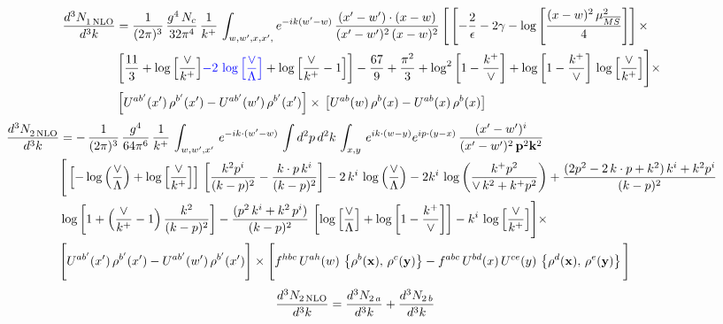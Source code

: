 \documentclass[9pt]{article}
\numberwithin{equation}{section}
\begin{document}
\begin{align}
     \frac{d^{3}N_{1\,\rm NLO}^{\rm}}{d^{3}k} &  = \frac{1}{(2\pi)^{3}}\, \frac{g^{4}\,N_{c}}{32\pi^{4}}\,\frac{1}{k^{+}}\, \int_{w, w',x,x',} e^{-ik(w^\prime-w)}\, \frac{(x'-w')\cdot (x-w)}{(x'-w')^{2}\, (x-w)^{2}}\, \Bigg[\left[-\frac{2}{\epsilon}-2\gamma-\log{\left[\frac{(x-w)^{2}\,\mu^{2}_{\overline{MS}}}{4}\right]}\right]\times \notag \\ & \left[\frac{11}{3}+\log{\left[\frac{\vee}{k^{+}}\right]}{\color{blue}-2\,\log{\left[\frac{\vee}{\Lambda}\right]}}+\log{\left[\frac{\vee}{k^{+}}-1\right]}\right]-\frac{67}{9}+\frac{\pi^{2}}{3}+\log^{2}{\left[1-\frac{k^{+}}{\vee}\right]}+\log{\left[1-\frac{k^{+}}{\vee}\right]}\,\log{\left[\frac{\vee}{k^{+}}\right]}\Bigg]\times\notag \\ & \left[U^{ab'}(x')\,\rho^{b'}(x') - U^{ab'}(w')\,\rho^{b'}(x')\right]\times\,\left[U^{ab}(w)\,\rho^{b}(x) - U^{ab}(x)\,\rho^{b}(x)\right]
\end{align}
\begin{align}
   \frac{d^{3}N_{2\,\rm NLO}^{\rm}}{d^{3}k} &  = -\,\frac{1}{(2\pi)^{3}}\,\frac{g^{4}}{64\pi^{6}}\, \frac{1}{k^{+}}\,\int_{w,w',x'}\, e^{-ik\cdot (w'-w)}\,\int d^{2}p\,d^{2}k\,\int_{x,y}\, e^{ik\cdot (w-y)} e^{ip\cdot (y-x)}\, \frac{(x'-w')^{i}}{(x'-w')^{2}\,\mathbf{p}^{2}\mathbf{k}^{2} }\notag \\ & \Bigg[\left[-\log{\left(\frac{\vee}{\Lambda}\right)}+\log{\left[\frac{\vee}{k^{+}}\right]}\right]\,\left[\frac{k^{2}p^{i}}{(k-p)^{2}}-\frac{k\cdot p\,k^{i}}{(k-p)^{2}}\right]-2\,k^{i}\,\log{\left(\frac{\vee}{\Lambda}\right)} -2k^{i}\,\log{\left(\frac{k^{+}p^{2}}{\vee\, k^{2}+k^{+}p^{2}}\right)}+\frac{(2p^{2}-2\,k\cdot p + k^{2})\,k^{i} + k^{2}p^{i}}{(k-p)^{2}}\notag \\ &  \log{\left[1+\left(\frac{\vee}{k^{+}}-1\right)\frac{k^{2}}{(k-p)^{2}}\right]} - \frac{(p^{2}\,k^{i}+k^{2}\,p^{i})}{(k-p)^{2}}\,\left[\log{\left[\frac{\vee}{\Lambda}\right]}+\log{\left[1-\frac{k^{+}}{\vee}\right]}\right]-k^{i}\,\log{\left[\frac{\vee}{k^{+}}\right]}\Bigg]\times\,\notag \\ &  \Bigg[U^{ab'}(x')\,\rho^{b'}(x') - U^{ab'}(w')\,\rho^{b'}(x')\Bigg]\times\Bigg[f^{hbc}\,U^{ah}(w)\,\left\{ \rho^{b}(\mathbf{x}),\,\rho^{c}(\mathbf{y})\right\}-f^{abc}\,U^{bd}(x)\, U^{ce}(y)\, \left\{\rho^{d}(\mathbf{x}),\,\rho^{e}(\mathbf{y})\right\}\Bigg]
\end{align}
\begin{align}
\frac{d^{3}N_{2\,\rm NLO}}{d^{3}k} &= \frac{d^{3}N_{2\,a}}{d^{3}k} + \frac{d^{3}N_{2\,b}}{d^{3}k}
\end{align}
\end{document}

